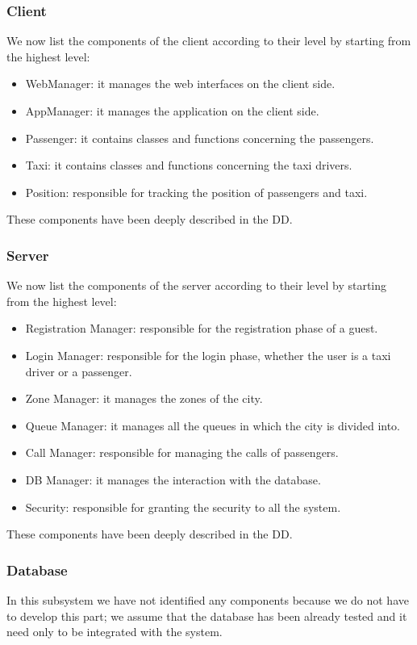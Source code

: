 \subsubsection{Client}
We now list the components of the client according to their level by starting from the highest level:
\begin{itemize}
    \item WebManager: it manages the web interfaces on the client side.
    \item AppManager: it manages the application on the client side.
    \item Passenger: it contains classes and functions concerning the passengers.
    \item Taxi: it contains classes and functions concerning the taxi drivers.
    \item Position: responsible for tracking the position of passengers and taxi.
\end{itemize}
These components have been deeply described in the DD.

\subsubsection{Server}
We now list the components of the server according to their level by starting from the highest level:
\begin{itemize}
    \item Registration Manager: responsible for the registration phase of a guest.
    \item Login Manager: responsible for the login phase, whether the user is a taxi driver or a passenger.
    \item Zone Manager: it manages the zones of the city.
    \item Queue Manager: it manages all the queues in which the city is divided into.
    \item Call Manager: responsible for managing the calls of passengers.
    \item DB Manager: it manages the interaction with the database.
    \item Security: responsible for granting the security to all the system.
\end{itemize}
These components have been deeply described in the DD.

\subsubsection{Database}
In this subsystem we have not identified any components because we do not have to develop this part; we assume that the database has been already tested and it need only to be integrated with the system.






